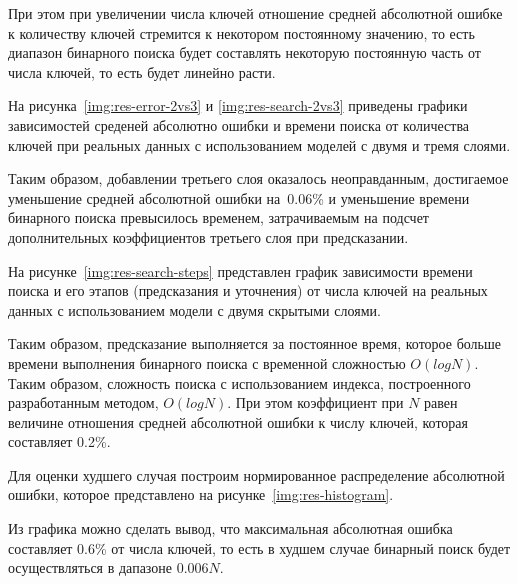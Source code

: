 При этом при увеличении числа ключей отношение средней абсолютной ошибке к
количеству ключей стремится к некотором постоянному значению, то есть диапазон
бинарного поиска будет составлять некоторую постоянную часть от числа ключей, то
есть будет линейно расти.

На рисунка~\ref{img:res-error-2vs3} и \ref{img:res-search-2vs3} приведены
графики зависимостей среденей абсолютно ошибки и времени поиска от количества
ключей при реальных данных с использованием моделей с двумя и тремя слоями.



Таким образом, добавлении третьего слоя оказалось неоправданным, достигаемое
уменьшение средней абсолютной ошибки на~0.06\% и уменьшение времени бинарного
поиска превысилось временем, затрачиваемым на подсчет дополнительных
коэффициентов третьего слоя при предсказании.

На рисунке~\ref{img:res-search-steps} представлен график зависимости времени
поиска и его этапов (предсказания и уточнения) от числа ключей на реальных
данных с использованием модели с двумя скрытыми слоями.


Таким образом, предсказание выполняется за постоянное время, которое больше
времени выполнения бинарного поиска с временной сложностью $O(log N)$. Таким
образом, сложность поиска с использованием индекса, построенного разработанным
методом, $O(log N)$. При этом коэффициент при $N$ равен величине отношения
средней абсолютной ошибки к числу ключей, которая составляет 0.2\%.

Для оценки худшего случая построим нормированное распределение абсолютной
ошибки, которое представлено на рисунке~\ref{img:res-histogram}.


Из графика можно сделать вывод, что максимальная абсолютная ошибка составляет
0.6\% от числа ключей, то есть в худшем случае бинарный поиск будет осуществляться
в дапазоне $0.006N$.


